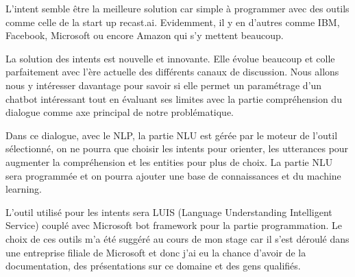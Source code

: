 L’intent semble être la meilleure solution car simple à programmer avec des outils comme celle de la start up recast.ai. Evidemment, il y en d’autres comme IBM, Facebook, Microsoft ou encore Amazon qui s’y mettent beaucoup.
\vspace{1em}

La solution des intents est nouvelle et innovante. Elle évolue beaucoup et colle parfaitement avec l’ère actuelle des différents canaux de discussion. Nous allons nous y intéresser davantage pour savoir si elle permet un paramétrage d’un chatbot intéressant tout en évaluant ses limites avec la partie compréhension du dialogue comme axe principal de notre problématique.
\vspace{1em}

Dans ce dialogue, avec le NLP, la partie NLU est gérée par le moteur de l’outil sélectionné, on ne pourra que choisir les intents pour orienter, les utterances pour augmenter la compréhension et les entities pour plus de choix.
La partie NLU sera programmée et on pourra ajouter une base de connaissances et du machine learning.
\vspace{1em}

L’outil utilisé pour les intents sera LUIS (Language Understanding Intelligent Service) couplé avec Microsoft bot framework pour la partie programmation. Le choix de ces outils m’a été suggéré au cours de mon stage car il s’est déroulé dans une entreprise filiale de Microsoft et donc j’ai eu la chance d’avoir de la documentation, des présentations sur ce domaine et des gens qualifiés.
